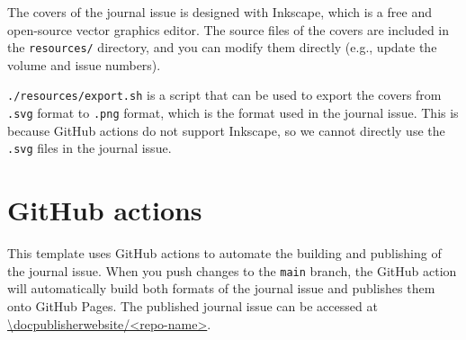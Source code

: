 The covers of the journal issue is designed with Inkscape, which is a free and open-source vector graphics editor.
The source files of the covers are included in the \verb|resources/| directory, and you can modify them directly (e.g., update the volume and issue numbers).

\verb|./resources/export.sh| is a script that can be used to export the covers from \verb|.svg| format to \verb|.png| format, which is the format used in the journal issue.
This is because GitHub actions do not support Inkscape, so we cannot directly use the \verb|.svg| files in the journal issue.

\section{GitHub actions}

This template uses GitHub actions to automate the building and publishing of the journal issue.
When you push changes to the \verb|main| branch, the GitHub action will automatically build both formats of the journal issue and publishes them onto GitHub Pages.
The published journal issue can be accessed at \url{\docpublisherwebsite/<repo-name>}.
